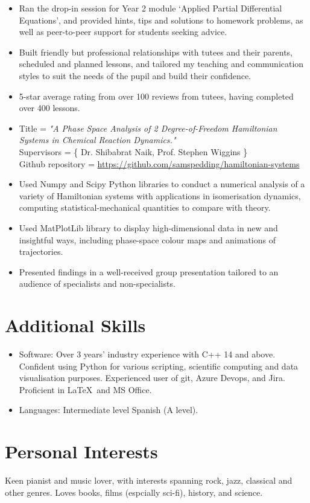 \documentclass{my_cv}
\begin{document}
\begin{itemize}
	\color{MidnightBlue}
\item Ran the drop-in session for Year 2 module ‘Applied Partial Differential Equations’, and provided hints, tips and solutions to homework problems, as well as peer-to-peer support for students seeking advice.
\end{itemize}

\begin{itemize}
	\color{MidnightBlue}
	\item Built friendly but professional relationships with tutees and their parents, scheduled and planned lessons, and tailored my teaching and communication styles to suit the needs of the pupil and build their confidence.
	\item 5-star average rating from over 100 reviews from tutees, having completed over 400 lessons.
\end{itemize}

\begin{itemize}
	\item[] Title = \textit{\color{Maroon}"A Phase Space Analysis of 2 Degree-of-Freedom Hamiltonian Systems in Chemical Reaction Dynamics."} \\
	Supervisors = \{ Dr. Shibabrat Naik, Prof. Stephen Wiggins \}\\
	Github repository = \url{https://github.com/samspedding/hamiltonian-systems}
	\color{MidnightBlue}
	\item Used Numpy and Scipy Python libraries to conduct a numerical analysis of a variety of Hamiltonian systems with applications in isomerisation dynamics, computing statistical-mechanical quantities to compare with theory.
	\item Used MatPlotLib library to display high-dimensional data in new and insightful ways, including phase-space colour maps and animations of trajectories.
	\item Presented findings in a well-received group presentation tailored to an audience of specialists and non-specialists.
\end{itemize}

\section{Additional Skills}
\begin{itemize}
\item Software: Over 3 years' industry experience with C++ 14 and above. Confident using Python for various scripting, scientific computing and data visualisation purposes. Experienced user of git, Azure Devops, and Jira. Proficient in \LaTeX\ and MS Office.
\item Languages: Intermediate level Spanish (A level).
\end{itemize}

\section{Personal Interests}
Keen pianist and music lover, with interests spanning rock, jazz, classical and other genres. Loves books, films (espcially sci-fi), history, and science.
\end{document}
